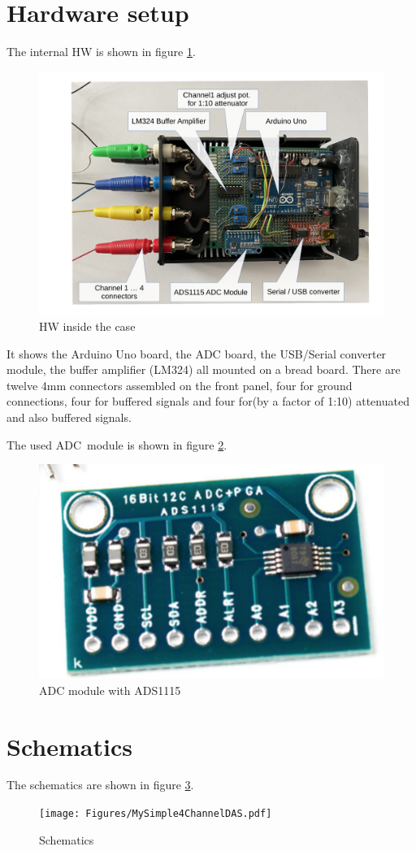 \documentclass[11pt, oneside]{scrartcl}   	%
\begin{document}
\section{Hardware setup}
The internal HW is shown in figure \ref{fig:HWInternals}.
\begin{figure}[htbp]
	\centering
	\includegraphics[width=0.85\linewidth]{Figures/HWInternals1.pdf}
	\caption{HW inside the case}
	\label{fig:HWInternals}
\end{figure}
It shows the Arduino Uno board, the ADC board, the USB/Serial converter module, the buffer amplifier (LM324) all mounted on a bread board.
There are twelve 4mm connectors assembled on the front panel, four for ground connections, four for buffered signals and four for(by a factor of 1:10) attenuated and also buffered signals.

The used ADC module is shown in figure \ref{fig:ADCModule}.
\begin{figure}[htbp]
	\centering
	\includegraphics[width=0.5\linewidth]{Figures/ADS1115ADCBoard.png}
	\caption{ADC module with ADS1115}
	\label{fig:ADCModule}
\end{figure}


\newpage
\section{Schematics}
The schematics are shown in figure \ref{fig:Schematics}.
\begin{figure}[htbp]
	\centering
	\texttt{[image: Figures/MySimple4ChannelDAS.pdf]}
	\caption[Schematics]{Schematics}
	\label{fig:Schematics}
\end{figure}
\end{document}
